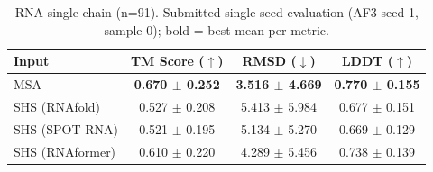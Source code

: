 \begin{table}[htbp]
\centering
\caption{RNA single chain (n=91). Submitted single-seed evaluation (AF3 seed 1, sample 0); bold = best mean per metric.}
\label{tab:rna_single_chain}
\begin{tabular}{lccc}
\toprule
Input & TM Score ($\uparrow$) & RMSD ($\downarrow$) & LDDT ($\uparrow$) \\
\midrule
MSA & \textbf{0.670 $\pm$ 0.252} & \textbf{3.516 $\pm$ 4.669} & \textbf{0.770 $\pm$ 0.155} \\
SHS (RNAfold) & 0.527 $\pm$ 0.208 & 5.413 $\pm$ 5.984 & 0.677 $\pm$ 0.151 \\
SHS (SPOT-RNA) & 0.521 $\pm$ 0.195 & 5.134 $\pm$ 5.270 & 0.669 $\pm$ 0.129 \\
SHS (RNAformer) & 0.610 $\pm$ 0.220 & 4.289 $\pm$ 5.456 & 0.738 $\pm$ 0.139 \\
\bottomrule
\end{tabular}
\end{table}
